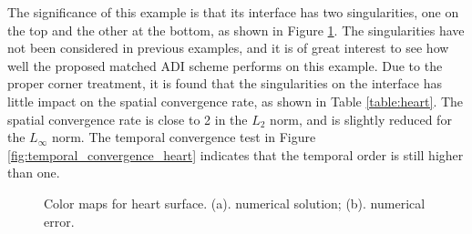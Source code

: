 \documentclass[dissertation]{uathesis}
\begin{document}
\begin{body}
The significance of this example is that its interface has two singularities, one on the top and the other at the bottom, as shown in Figure \ref{fig:color_map_heart}. The singularities have not been considered in previous examples, and it is of great interest to see how well the proposed matched ADI scheme performs on this example. 
Due to the proper corner treatment, it is found that the singularities on the interface has little impact on the spatial convergence rate, as shown in Table \ref{table:heart}. 
The spatial convergence rate is close to 2 in the $L_2$ norm, and is slightly reduced 
for the $L_{\infty}$ norm. 
The temporal convergence test in Figure \ref{fig:temporal_convergence_heart}  indicates that the temporal  order is still higher than one. 
%
\begin{figure}[!ht]	
	\begin{center}
	\end{center}
	\caption{Color maps for heart surface. (a). numerical solution; (b). numerical error.}
	\label{fig:color_map_heart}
\end{figure}
%



\end{body}
\end{document}
